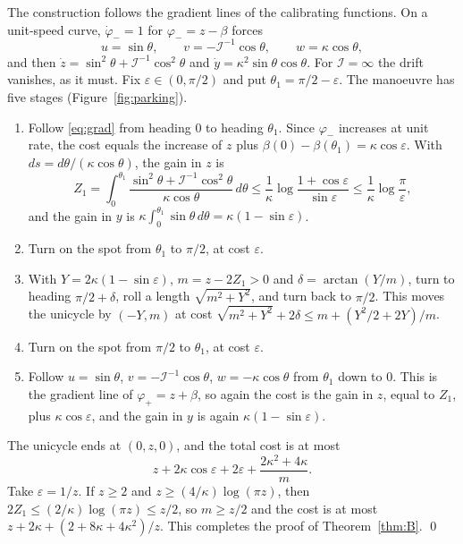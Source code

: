 \documentclass[11pt]{amsart}
\theoremstyle{definition}
\newcommand{\I}{\mathcal{I}}
\begin{document}
The construction follows the gradient lines of the calibrating functions. On a unit-speed curve, $\dot\varphi_-=1$ for $\varphi_-=z-\beta$ forces
\begin{equation}\label{eq:grad}
u=\sin\theta,\qquad v=-\I^{-1}\cos\theta,\qquad w=\kappa\cos\theta,
\end{equation}
and then $\dot z=\sin^2\theta+\I^{-1}\cos^2\theta$ and $\dot y=\kappa^2\sin\theta\cos\theta$. For $\I=\infty$ the drift vanishes, as it must. Fix $\varepsilon\in(0,\pi/2)$ and put $\theta_1=\pi/2-\varepsilon$. The manoeuvre has five stages (Figure~\ref{fig:parking}).

\begin{enumerate}
\item Follow \eqref{eq:grad} from heading $0$ to heading $\theta_1$. Since $\varphi_-$ increases at unit rate, the cost equals the increase of $z$ plus $\beta(0)-\beta(\theta_1)=\kappa\cos\varepsilon$. With $ds=d\theta/(\kappa\cos\theta)$, the gain in $z$ is
\[
Z_1=\int_0^{\theta_1}\frac{\sin^2\theta+\I^{-1}\cos^2\theta}{\kappa\cos\theta}\,d\theta\le\frac1\kappa\log\frac{1+\cos\varepsilon}{\sin\varepsilon}\le\frac1\kappa\log\frac{\pi}{\varepsilon},
\]
and the gain in $y$ is $\kappa\int_0^{\theta_1}\sin\theta\,d\theta=\kappa(1-\sin\varepsilon)$.
\item Turn on the spot from $\theta_1$ to $\pi/2$, at cost $\varepsilon$.
\item With $Y=2\kappa(1-\sin\varepsilon)$, $m=z-2Z_1>0$ and $\delta=\arctan(Y/m)$, turn to heading $\pi/2+\delta$, roll a length $\sqrt{m^2+Y^2}$, and turn back to $\pi/2$. This moves the unicycle by $(-Y,m)$ at cost $\sqrt{m^2+Y^2}+2\delta\le m+(Y^2/2+2Y)/m$.
\item Turn on the spot from $\pi/2$ to $\theta_1$, at cost $\varepsilon$.
\item Follow $u=\sin\theta$, $v=-\I^{-1}\cos\theta$, $w=-\kappa\cos\theta$ from $\theta_1$ down to $0$. This is the gradient line of $\varphi_+=z+\beta$, so again the cost is the gain in $z$, equal to $Z_1$, plus $\kappa\cos\varepsilon$, and the gain in $y$ is again $\kappa(1-\sin\varepsilon)$.
\end{enumerate}

The unicycle ends at $(0,z,0)$, and the total cost is at most
\[
z+2\kappa\cos\varepsilon+2\varepsilon+\frac{2\kappa^2+4\kappa}{m}.
\]
Take $\varepsilon=1/z$. If $z\ge2$ and $z\ge(4/\kappa)\log(\pi z)$, then $2Z_1\le(2/\kappa)\log(\pi z)\le z/2$, so $m\ge z/2$ and the cost is at most $z+2\kappa+(2+8\kappa+4\kappa^2)/z$. This completes the proof of Theorem~\ref{thm:B}. \qed
\end{document}
